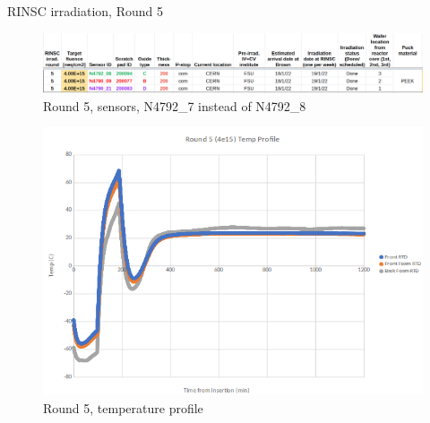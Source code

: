 \documentclass{beamer}
\begin{document}
\begin{frame}{RINSC irradiation, Round 5}

    \begin{figure}
        \includegraphics[width=.7\textwidth]{plots/Round_5_sensors.png}
        \caption{Round 5, sensors, N4792\_7 instead of N4792\_8}
    \end{figure}
    \begin{figure}
      \includegraphics[width=.5\textwidth]{plots/Round5_temp_profile.png}
      \caption{Round 5, temperature profile}
    \end{figure}
\end{frame}
\end{document}
